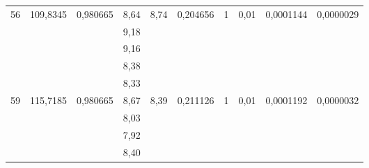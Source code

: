 \documentclass[a4paper, 12pt]{article}
\begin{document}
\begin{table}[h!]
\begin{tabular}{|c|c|c|c|c|c|c|c|c|c|}
\multirow{5}{*}{56} & \multirow{5}{*}{109,8345} & \multirow{5}{*}{0,980665} & 8,64           & \multirow{5}{*}{8,74}     & \multirow{5}{*}{0,204656}          & \multirow{5}{*}{1} & \multirow{5}{*}{0,01}   & \multirow{5}{*}{0,0001144} & \multirow{5}{*}{0,0000029}    \\ \cline{4-4}
                    &                           &                           & 9,18           &                           &                                    &                    &                         &                            &                               \\ \cline{4-4}
                    &                           &                           & 9,16           &                           &                                    &                    &                         &                            &                               \\ \cline{4-4}
                    &                           &                           & 8,38           &                           &                                    &                    &                         &                            &                               \\ \cline{4-4}
                    &                           &                           & 8,33           &                           &                                    &                    &                         &                            &                               \\ \hline
\multirow{5}{*}{59} & \multirow{5}{*}{115,7185} & \multirow{5}{*}{0,980665} & 8,67           & \multirow{5}{*}{8,39}     & \multirow{5}{*}{0,211126}          & \multirow{5}{*}{1} & \multirow{5}{*}{0,01}   & \multirow{5}{*}{0,0001192} & \multirow{5}{*}{0,0000032}    \\ \cline{4-4}
                    &                           &                           & 8,03           &                           &                                    &                    &                         &                            &                               \\ \cline{4-4}
                    &                           &                           & 7,92           &                           &                                    &                    &                         &                            &                               \\ \cline{4-4}
                    &                           &                           & 8,40           &                           &                                    &                    &                         &                            &                               \\ \cline{4-4}

\end{tabular}
\end{table}
\end{document}
